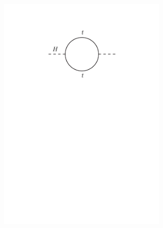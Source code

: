 \begin{figure}[h!]
\begin{subfigure}{0.33\textwidth}
  \centering
  \includegraphics[width=0.9\textwidth]{figures/Theory/loop_toptop_good.pdf}
  \caption{}
  \label{}
\end{subfigure}
\begin{subfigure}{0.33\textwidth}
  \centering

\end{subfigure}
\end{figure}
